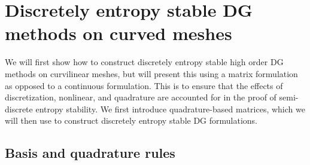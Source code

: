 \documentclass[preprint,10pt]{article}
\theoremstyle{definition}
\theoremstyle{lemma}
\theoremstyle{theorem}
\theoremstyle{assumption}
\begin{document}
\section{Discretely entropy stable DG methods on curved meshes}

We will first show how to construct discretely entropy stable high order DG methods on curvilinear meshes, but will present this using a matrix formulation as opposed to a continuous formulation.  This is to ensure that the effects of discretization, nonlinear, and quadrature are accounted for in the proof of semi-discrete entropy stability.  We first introduce quadrature-based matrices, which we will then use to construct discretely entropy stable DG formulations.


\subsection{Basis and quadrature rules}
\end{document}
